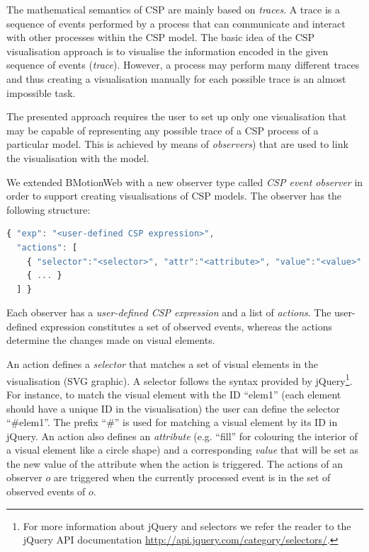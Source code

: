 The mathematical semantics of CSP are mainly based on \textit{traces}.
A trace is a sequence of events performed by a process that can communicate and interact with other processes within the CSP model.
The basic idea of the CSP visualisation approach is to visualise the information encoded in the given sequence of events (\textit{trace}).
However, a process may perform many different traces and thus creating a visualisation manually for each possible trace is an almost impossible task.

The presented approach requires the user to set up only one visualisation that may be capable of representing any possible trace of a CSP process of a particular model. 
This is achieved by means of \textit{observers}) that are used to link the visualisation with the model.

We extended BMotionWeb with a new observer type called \textit{CSP event observer} in order to support creating visualisations of CSP models.
The observer has the following structure:

\begin{lstlisting}[language=JavaScript]
{ "exp": "<user-defined CSP expression>", 
  "actions": [ 
    { "selector":"<selector>", "attr":"<attribute>", "value":"<value>" },
    { ... }
  ] }
\end{lstlisting}

Each observer has a \textit{user-defined CSP expression} and a list of \textit{actions}.
The user-defined expression constitutes a set of observed events, whereas the actions determine the changes made on visual elements.

An action defines a \textit{selector} that matches a set of visual elements in the visualisation (SVG graphic). 
A selector follows the syntax provided by jQuery\footnote{For more information about jQuery and selectors we refer the reader to the jQuery API documentation \url{http://api.jquery.com/category/selectors/}.}. 
For instance, to match the visual element with the ID ``elem1'' (each element should have a unique ID in the visualisation) the user can define the selector ``\#elem1''. 
The prefix ``\#'' is used for matching a visual element by its ID in jQuery. 
An action also defines an \textit{attribute} (e.g. ``fill'' for colouring the interior of a visual element like a circle shape) and a corresponding \textit{value} that will be set as the new value of the attribute when the action is triggered.
The actions of an observer $o$ are triggered when the currently processed event is in the set of observed events of $o$.

